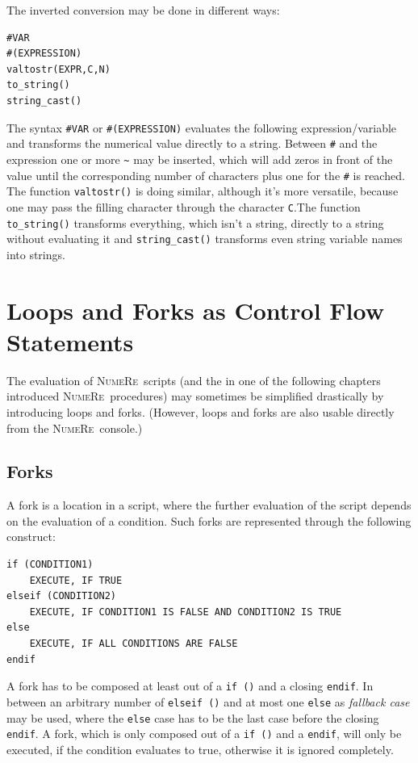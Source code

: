 \documentclass[DIV=14,headsepline,footsepline]{scrbook}
\newcommand{\NR}{\textsc{Nu\-me\-Re}}
\begin{document}
				The inverted conversion may be done in different ways:
				\begin{lstlisting}
#VAR
#(EXPRESSION)
valtostr(EXPR,C,N)
to_string()
string_cast()
				\end{lstlisting}
				The syntax \lstinline+#VAR+ or \lstinline+#(EXPRESSION)+ evaluates the following expression/variable and transforms the numerical value directly to a string. Between \lstinline+#+ and the expression one or more \lstinline+~+ may be inserted, which will add zeros in front of the value until the corresponding number of characters plus one for the \lstinline+#+ is reached. The function \lstinline+valtostr()+ is doing similar, although it's more versatile, because one may pass the filling character through the character \lstinline+C+.The function \lstinline+to_string()+ transforms everything, which isn't a string, directly to a string without evaluating it and \lstinline+string_cast()+ transforms even string variable names into strings.
		\chapter{Loops and Forks as Control Flow Statements}
			The evaluation of \NR\ scripts (and the in one of the following chapters introduced \NR\ procedures) may sometimes be simplified drastically by introducing loops and forks. (However, loops and forks are also usable directly from the \NR\ console.)
			\section{Forks}
				A fork is a location in a script, where the further evaluation of the script depends on the evaluation of a condition. Such forks are represented through the following construct:
				\begin{lstlisting}
if (CONDITION1)
	EXECUTE, IF TRUE
elseif (CONDITION2)
	EXECUTE, IF CONDITION1 IS FALSE AND CONDITION2 IS TRUE
else
	EXECUTE, IF ALL CONDITIONS ARE FALSE
endif
				\end{lstlisting}
				
				A fork has to be composed at least out of a \lstinline+if ()+ and a closing \lstinline+endif+. In between an arbitrary number of \lstinline+elseif ()+ and at most one \lstinline+else+ as \emph{fallback case} may be used, where the \lstinline+else+ case has to be the last case before the closing \lstinline+endif+. A fork, which is only composed out of a \lstinline+if ()+ and a \lstinline+endif+, will only be executed, if the condition evaluates to true, otherwise it is ignored completely.
			
\end{document}
